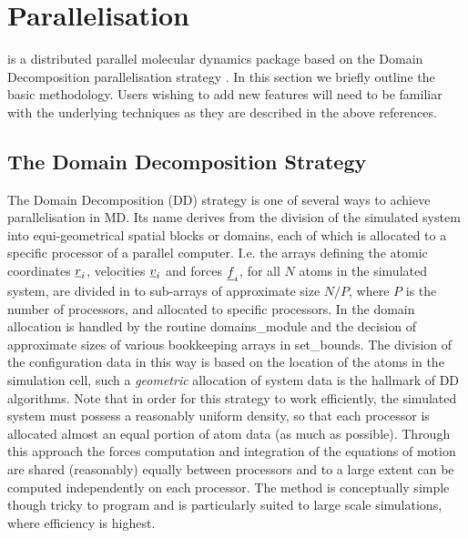 \section{Parallelisation}

\D is a distributed parallel molecular dynamics package based on
the Domain Decomposition parallelisation strategy
\cite{todorov-04a,todorov-06a,pinches-91a,rapaport-91b,smith-91a,smith-93a}.
In this section we briefly outline the basic methodology.  Users
wishing to add new features \D will need to be familiar with the
underlying techniques as they are described in the above
references.

\subsection{The Domain Decomposition Strategy}\label{parallelisation}

The Domain Decomposition (DD) strategy
\cite{todorov-04a,todorov-06a,smith-91a} is one of several ways to achieve
parallelisation in MD.  Its name derives
from the division of the simulated system into equi-geometrical
spatial blocks or domains, each of which is allocated to a
specific processor of a parallel computer.  I.e. the arrays
defining the atomic coordinates $\mbox{$\underline{r}$}_{i}$, velocities
$\mbox{$\underline{v}$}_{i}$ and forces $\mbox{$\underline{f}$}_{i}$, for all $N$ atoms in the
simulated system, are divided in to sub-arrays of approximate size
$N/P$, where $P$ is the number of processors, and allocated to
specific processors.  In \D the domain allocation is handled by
the routine {\sc domains\_module} and the decision of approximate
sizes of various bookkeeping arrays in {\sc set\_bounds}.  The
division of the configuration data in this way is based on the
location of the atoms in the simulation cell, such a {\em
geometric} allocation of system data is the hallmark of DD
algorithms.  Note that in order for this strategy to work
efficiently, the simulated system must possess a reasonably
uniform density, so that each processor is allocated almost an equal
portion of atom data (as much as possible).  Through this approach
the forces computation and integration of the equations of motion
are shared (reasonably) equally between processors and to a large
extent can be computed independently on each processor.  The
method is conceptually simple though tricky to program and is
particularly suited to large scale simulations, where efficiency
is highest.

